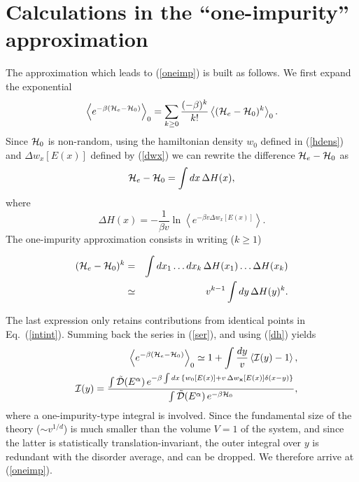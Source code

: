 \section{Calculations in the ``one-impurity'' approximation}
\label{appb}
The approximation which leads to (\ref{oneimp}) is built as follows. We first expand the exponential
\begin{equation}
\label{ser}
\left\langle e^{-\beta({\cal H}_e-{\cal H}_0)}\right\rangle_0=\sum_{k\geq 0}
{(-\beta)^k\over k!} \left\langle({\cal H}_e-{\cal H}_0)^k\right\rangle_0.
\end{equation}
Since ${\cal H}_0$ is non-random, using the hamiltonian 
density $w_0$ defined in (\ref{hdens}) and $\Delta w_x[E(x)]$ defined by (\ref{dwx}) we can rewrite  the difference ${\cal H}_e-{\cal H}_0$ as
\begin{equation}
{\cal H}_e-{\cal H}_0=\int dx\, \Delta H(x),
\end{equation}
where 
\begin{equation}
\label{dh}
\Delta H(x)=-\frac{1}{\beta v}\ln\left\langle e^{-\beta v \Delta w_x[E(x)]}\right\rangle.
\end{equation}
The one-impurity approximation consists in writing ($k\geq 1$)
\begin{mathletters}
\begin{eqnarray}
\label{intint}
({\cal H}_e-{\cal H}_0)^k
&=&
\int dx_1\ldots dx_k\,\Delta H(x_1)
\ldots
\Delta H(x_k)\\ 
&\simeq& v^{k-1}\int dy\, 
\Delta H(y)^k.
\end{eqnarray}
\end{mathletters}
The last expression only retains contributions from identical points 
in Eq.\ (\ref{intint}). Summing back the series in (\ref{ser}), and using (\ref{dh}) yields
\begin{eqnarray}
\label{ebracko}
&&\left\langle e^{-\beta({\cal H}_e-{\cal H}_0)}\right\rangle_0
\simeq 
1+\int {dy\over v}
\left\langle {\cal I}(y)-1\right\rangle,\\
\label{caliy}
&&{\cal I}(y)=\frac{\int \tilde{\cal D}(E^{\alpha})\,
e^{-\beta\int dx\, \left\{w_0[E(x)]
+v\,\Delta w_{\bf x}[E(x)]
\delta(x-y)\right\}}}
{\int \tilde{\cal D}(E^{\alpha})\,e^{-\beta {\cal H}_0}},
\end{eqnarray}
where a one-impurity-type integral is involved. Since the fundamental
size of the theory ($\sim v^{1/d}$) is much smaller than the volume
$V=1$ of the system, and since the latter is statistically
translation-invariant, the outer integral over $y$ is redundant with
the disorder average, and can be dropped. We therefore arrive at
(\ref{oneimp}).

